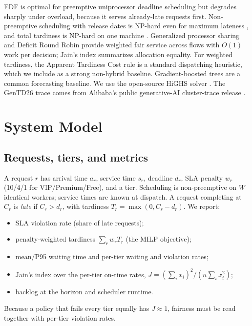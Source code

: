 \documentclass[conference]{IEEEtran}
\begin{document}
EDF is optimal for preemptive uniprocessor deadline scheduling \cite{liu1973,dertouzos1974} but degrades sharply under overload, because it serves already-late requests first. Non-preemptive scheduling with release dates is NP-hard even for maximum lateness \cite{lenstra1977}, and total tardiness is NP-hard on one machine \cite{du1990}. Generalized processor sharing \cite{parekh1993} and Deficit Round Robin \cite{shreedhar1996} provide weighted fair service across flows with $O(1)$ work per decision; Jain's index \cite{jain1984} summarizes allocation equality. For weighted tardiness, the Apparent Tardiness Cost rule \cite{vepsalainen1987} is a standard dispatching heuristic, which we include as a strong non-hybrid baseline. Gradient-boosted trees \cite{chen2016} are a common forecasting baseline. We use the open-source HiGHS solver \cite{huangfu2018}. The GenTD26 trace comes from Alibaba's public generative-AI cluster-trace release \cite{gentd26}.

\section{System Model}

\subsection{Requests, tiers, and metrics}
A request $r$ has arrival time $a_r$, service time $s_r$, deadline $d_r$, SLA penalty $w_r$ (10/4/1 for VIP/Premium/Free), and a tier. Scheduling is non-preemptive on $W$ identical workers; service times are known at dispatch. A request completing at $C_r$ is \emph{late} if $C_r>d_r$, with tardiness $T_r=\max(0,C_r-d_r)$. We report:
\begin{itemize}
\item SLA violation rate (share of late requests);
\item penalty-weighted tardiness $\sum_r w_rT_r$ (the MILP objective);
\item mean/P95 waiting time and per-tier waiting and violation rates;
\item Jain's index \cite{jain1984} over the per-tier on-time rates, $J=(\sum_ix_i)^2/(n\sum_ix_i^2)$;
\item backlog at the horizon and scheduler runtime.
\end{itemize}
Because a policy that fails every tier equally has $J\approx1$, fairness must be read together with per-tier violation rates.
\end{document}
